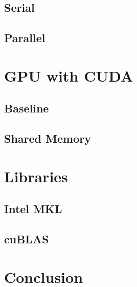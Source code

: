 \documentclass[11pt,fancy,authoryear]{elegantbook}
\begin{document}
\section{Serial}

\section{Parallel}

\chapter{GPU with CUDA}

\section{Baseline}

\section{Shared Memory}

\chapter{Libraries}

\section{Intel MKL}

\section{cuBLAS}

\chapter{Conclusion}
\end{document}
